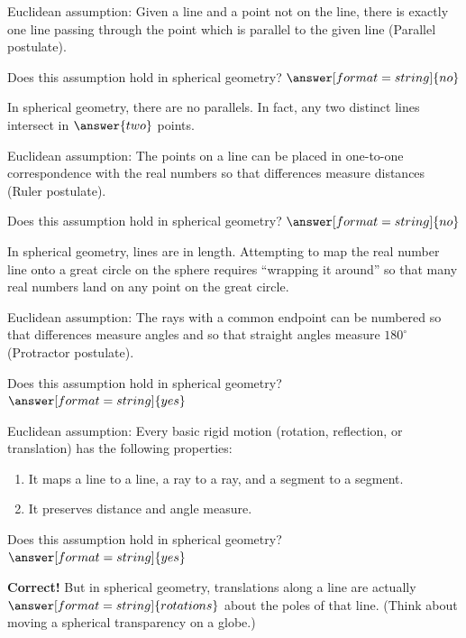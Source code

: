 \documentclass{ximera}
\begin{document}
\begin{problem} %
Euclidean assumption: Given a line and a point not on the line, there is exactly one line passing through the point which is parallel to the given line (Parallel postulate).  

Does this assumption hold in spherical geometry? 
$\answer[format=string]{no}$
\begin{problem}
In spherical geometry, there are no parallels.  In fact, any two distinct lines intersect in $\answer{two}$ points.  

\end{problem}
\end{problem}

\begin{problem} %
Euclidean assumption:  The points on a line can be placed in one-to-one correspondence with the real numbers so that differences measure distances (Ruler postulate).  

Does this assumption hold in spherical geometry? 
$\answer[format=string]{no}$

\begin{problem}

In spherical geometry, lines are  in length.  Attempting to map the real number line onto a great circle on the sphere requires ``wrapping it around'' so that many real numbers land on any point on the great circle.  
\end{problem}
\end{problem}

\begin{problem} %
Euclidean assumption:  The rays with a common endpoint can be numbered so that differences measure angles and so that straight angles measure $180^\circ$ (Protractor postulate).  

Does this assumption hold in spherical geometry? 
$\answer[format=string]{yes}$
\end{problem}

\begin{problem} %
Euclidean assumption: Every basic rigid motion (rotation, reflection, or translation) has the following properties: 
\begin{enumerate}
\item It maps a line to a line, a ray to a ray, and a segment to a segment.
\item It preserves distance and angle measure.
\end{enumerate}

Does this assumption hold in spherical geometry? 
$\answer[format=string]{yes}$
\begin{feedback}[correct]
\textbf{Correct!} But in spherical geometry, translations along a line are actually $\answer[format=string]{rotations}$ about the poles of that line.  (Think about moving a spherical transparency on a globe.) 
\end{feedback}
\end{problem}
\end{document}
